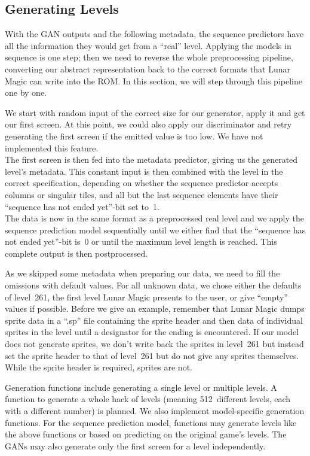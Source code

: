 \subsection{Generating Levels}
\label{sec:generating-levels}

With the GAN outputs and the following metadata, the sequence
predictors have all the information they would get from a ``real''
level. Applying the models in sequence is one step; then we need to
reverse the whole preprocessing pipeline, converting our abstract
representation back to the correct formats that Lunar Magic can write
into the ROM. In this section, we will step through this pipeline one
by one.

We start with random input of the correct size for our generator,
apply it and get our first screen. At this point, we could also apply
our discriminator and retry generating the first screen if the emitted
value is too low. We have not implemented this feature. \\
The first screen is then fed into the metadata predictor, giving us
the generated level's metadata. This constant input is then combined
with the level in the correct specification, depending on whether the
sequence predictor accepts columns or singular tiles, and all but the
last sequence elements have their ``sequence has not ended yet''-bit
set to~1. \\
The data is now in the same format as a preprocessed real level and we
apply the sequence prediction model sequentially until we either find
that the ``sequence has not ended yet''-bit is~0 or until the maximum
level length is reached. This complete output is then postprocessed.

As we skipped some metadata when preparing our data, we need to fill
the omissions with default values. For all unknown data, we chose
either the defaults of level~261, the first level Lunar Magic presents
to the user, or give ``empty'' values if possible. Before we give an
example, remember that Lunar Magic dumps sprite data in a ``.sp'' file
containing the sprite header and then data of individual sprites in
the level until a designator for the ending is encountered. If our
model does not generate sprites, we don't write back the sprites in
level~261 but instead set the sprite header to that of level~261 but
do not give any sprites themselves. While the sprite header is
required, sprites are not.

Generation functions include generating a single level or multiple
levels. A function to generate a whole hack of levels (meaning
512~different levels, each with a different number) is planned. We
also implement model-specific generation functions. For the sequence
prediction model, functions may generate levels like the above
functions or based on predicting on the original game's levels. The
GANs may also generate only the first screen for a level
independently.

